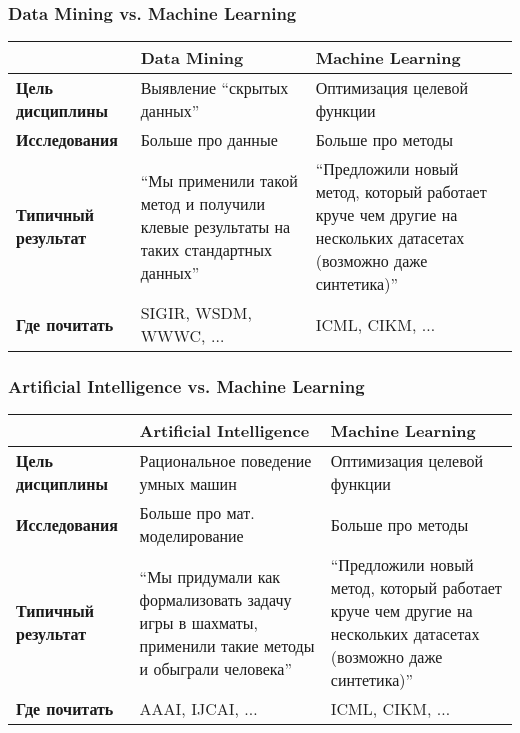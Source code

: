 \documentclass[14pt, fleqn, xcolor={dvipsnames, table}]{beamer}
\begin{document}
\begin{frame}
\frametitle{Data Mining vs. Machine Learning}
\begin{center}
\footnotesize
\begin{tabular}{p{}|p{}|p{}}
\rowcolor{Blue!20}
& \small Data Mining & \small Machine Learning \\
\hline 
\bf Цель дисциплины & Выявление ``скрытых данных'' & Оптимизация целевой функции \\		
\bf Исследования & Больше про данные & Больше про методы \\
\bf Типичный результат & ``Мы применили такой метод и получили клевые результаты на таких стандартных данных'' & ``Предложили новый метод, который работает круче чем другие на нескольких датасетах (возможно даже синтетика)'' \\
\bf Где почитать & SIGIR, WSDM, WWWC, $\ldots$ & ICML, CIKM, $\ldots$ \\
\end{tabular}
\end{center}
\end{frame}

\begin{frame}
\frametitle{Artificial Intelligence vs. Machine Learning}
\begin{center}
\footnotesize
\begin{tabular}{p{}|p{}|p{}}
\rowcolor{Blue!20}
& \small Artificial Intelligence & \small Machine Learning \\
\hline 
\bf Цель дисциплины & Рациональное поведение умных машин & Оптимизация целевой функции \\		
\bf Исследования & Больше про мат. моделирование & Больше про методы \\
\bf Типичный результат & ``Мы придумали как формализовать задачу игры в шахматы, применили такие методы и обыграли человека'' & ``Предложили новый метод, который работает круче чем другие на нескольких датасетах (возможно даже синтетика)'' \\
\bf Где почитать & AAAI, IJCAI, $\ldots$ & ICML, CIKM, $\ldots$ \\
\end{tabular}
\end{center}
\end{frame}
\end{document}
